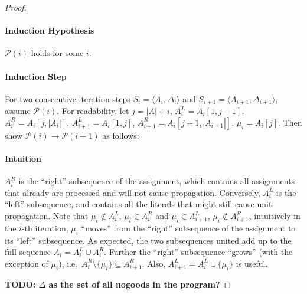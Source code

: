 \documentclass{vutinfth} %
\newcommand{\todo}[1]{{\color{red}\textbf{TODO: {#1}}}} %
\newcommand{\ass}{A}
\newcommand{\sgl}{\mu}
\begin{document}
\begin{proof}
\paragraph{Induction Hypothesis} $\mathcal{P}(i)$ holds for some $i$.

\paragraph{Induction Step} For two consecutive iteration steps $S_{i} = \langle \ass_{i}, \Delta_{i} \rangle$ and $S_{i+1} = \langle \ass_{i+1}, \Delta_{i+1} \rangle$, assume $\mathcal{P}(i)$. For readability, let $j = |A| + i$, $\ass_i^L = \ass_i[1, j - 1]$, $\ass_i^R = \ass_i[j, |\ass_i|]$, $\ass_{i+1}^L = \ass_i[1, j]$, $\ass_{i+1}^R = \ass_i[j + 1,|\ass_{i+1}|]$, $\sgl_i = A_i[j]$. Then show $\mathcal{P}(i) \to \mathcal{P}(i + 1)$ as follows:

\paragraph{Intuition} $\ass_i^R$ is the \enquote{right} subsequence of the assignment, which contains all assignments that already are processed and will not cause propagation. Conversely, $\ass_i^L$ is the \enquote{left} subsequence, and contains all the literals that might still cause unit propagation. Note that $\sgl_i \not \in \ass_i^L$, $\sgl_i \in \ass_i^R$ and $\sgl_i \in \ass_{i+1}^L$, $\sgl_i \not \in \ass_{i+1}^R$, intuitively in the $i$-th iteration, $\sgl_i$ \enquote{moves} from the \enquote{right} subsequence of the assignment to its \enquote{left} subsequence. As expected, the two subsequences united add up to the full sequence $A_i = A_i^L \cup A_i^R$. Further the \enquote{right} subsequence \enquote{grows} (with the exception of $\sgl_i$), i.e.~$\ass_{i}^R \setminus \{ \sgl_i \} \subseteq \ass_{i+1}^R$. Also, $\ass_{i+1}^L = \ass_{i}^L \cup \{ \sgl_i \}$ is useful.

\todo{$\Delta$ as the set of all nogoods in the program?}


\end{proof}
\end{document}
